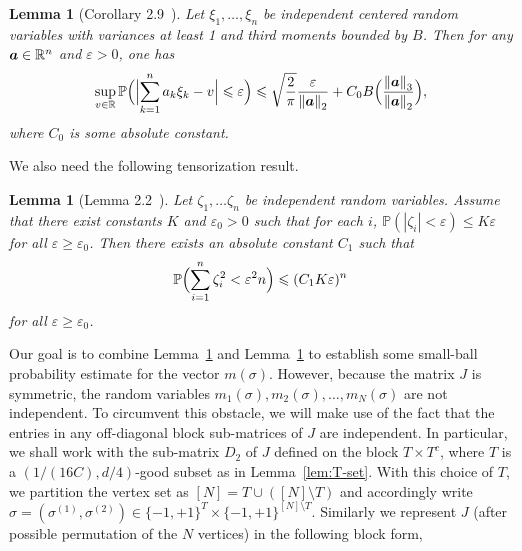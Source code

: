 \documentclass[letterpaper,11pt,reqno]{amsart}
\newtheorem{lem}[thm]{Lemma}
\renewcommand{\le}{\leqslant}
\renewcommand{\ge}{\geqslant}
\newcommand{\eps}{\varepsilon}
\newcommand{\norm}[1]{\left\Vert#1\right\Vert}
\newcommand{\abs}[1]{\left\vert#1\right\vert}
\newcommand{\mvm}{{m}}
\newcommand{\mvgs}{{\sigma}}
\newcommand{\bP}{\mathbb{P}}\newcommand{\bQ}{\mathbb{Q}}\newcommand{\bR}{\mathbb{R}}
\begin{document}
\begin{lem}[Corollary 2.9~\cite{RV08}]\label{thm:small-ball}
Let $\xi_1, \ldots, \xi_n$ be independent centered random variables with variances at least 1 and third moments bounded by $B$. Then for any $\mva \in \bR^n$ and $\eps> 0$, one has 
\[
\sup_{v\in \bR} \bP\Bigl(\Bigl|\sum_{k=1}^n a_k \xi_k - v\Bigr| \le \eps\Bigr) \le \sqrt{\frac{2}{\pi}} \frac{\eps}{\norm{\mva}_2} + C_0 B \Bigl(\frac{\norm{\mva}_3}{\norm{\mva}_2} \Bigr),
\]
where $C_0$ is some absolute constant.
\end{lem}
We also need the following tensorization result.
\begin{lem}[Lemma 2.2~\cite{RV08}]\label{lem:tensor}
    Let $\zeta_1, \ldots \zeta_n$ be independent random variables. Assume that there exist constants $K$ and $\eps_0>0$ such that for each $i$, 
    $\bP(\abs{\zeta_i}< \eps) \le K \eps$ for all $\eps\ge \eps_0$.
     Then there exists an absolute constant $C_1$ such that 
     \[
     \bP\Bigl(\sum_{i=1}^n \zeta_i^2 < \eps^2 n\Bigr) \le (C_1 K\eps)^n\]
     for all $\eps\ge \eps_0$.
\end{lem}
Our goal is to combine Lemma~\ref{thm:small-ball} and Lemma~\ref{lem:tensor} to establish some small-ball probability estimate for the vector $\mvm(\mvgs)$. However, because the matrix $J$ is symmetric, the random variables $m_1(\mvgs), m_2(\mvgs), \ldots, m_N(\mvgs)$ are not independent. To circumvent this obstacle, we will make use of the fact that the entries in any off-diagonal block sub-matrices of $J$ are independent. In particular, we shall work with the sub-matrix $D_2$ of $J$ defined on the block $T\times T^c$, where $T$ is a $(1/(16C), d/4)$-good subset as in Lemma~\ref{lem:T-set}. With this choice of $T$, we partition the vertex set as $[N] = T \cup ([N]\setminus T)$ and accordingly write 
$\mvgs = (\mvgs^{(1)}, \mvgs^{(2)})\in\{-1,+1\}^T\times\{-1,+1\}^{[N]\setminus T}$. Similarly we represent $J$ (after possible permutation of the $N$ vertices) in the following block form,


\end{document}

